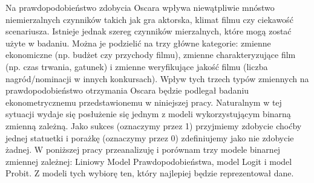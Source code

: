 Na prawdopodobieństwo zdobycia Oscara wpływa niewątpliwie mnóstwo niemierzalnych czynników takich jak gra aktorska, klimat filmu czy ciekawość scenariusza. Istnieje jednak szereg czynników mierzalnych, które mogą zostać użyte w badaniu. Można je podzielić na trzy główne kategorie: zmienne ekonomiczne (np. budżet czy przychody filmu), zmienne charakteryzujące film (np. czas trwania, gatunek) i zmienne weryfikujące jakość filmu (liczba nagród/nominacji w innych konkursach). Wpływ tych trzech typów zmiennych na prawdopodobieństwo otrzymania Oscara będzie podlegał badaniu ekonometrycznemu przedstawionemu w niniejszej pracy. Naturalnym w tej sytuacji wydaje się posłużenie się jednym z modeli wykorzystującym binarną zmienną zależną. Jako sukces (oznaczymy przez 1) przyjmiemy zdobycie choćby jednej statuetki i porażkę (oznaczymy przez 0) zdefiniujemy jako nie zdobycie żadnej. W poniższej pracy przeanalizuję i porównam trzy modele binarnej zmiennej zależnej: Liniowy Model Prawdopodobieństwa, model Logit i model Probit. Z modeli tych wybiorę ten, który najlepiej będzie reprezentował dane.
